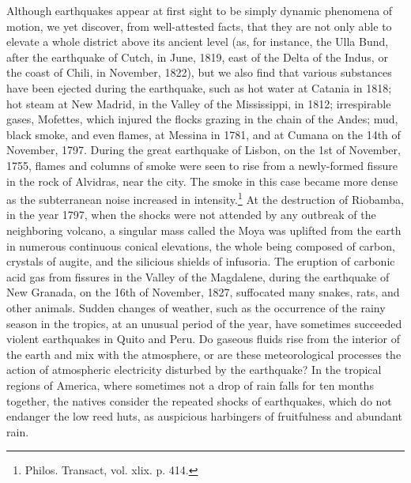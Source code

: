 Although earthquakes appear at first sight to be simply dynamic phenomena of motion, we yet discover, from well-attested facts, that they are not only able to elevate a whole district above its ancient level (as, for instance, the Ulla Bund, after the earthquake of Cutch, in June, 1819, east of the Delta of the Indus, or the coast of Chili, in November, 1822), but we also find that various substances have been ejected during the earthquake, such as hot water at Catania in 1818; hot steam at New Madrid, in the Valley of the Mississippi, in 1812; irrespirable gases, Mofettes, which injured the flocks grazing in the chain of the Andes; mud, black smoke, and even flames, at Messina in 1781, and at Cumana on the 14th of November, 1797. During the great earthquake of Lisbon, on the 1st of November, 1755, flames and columns of smoke were seen to rise from a newly-formed fissure in the rock of Alvidras, near the city. The smoke in this case became more dense as the subterranean noise increased in intensity.\footnote{Philos. Transact, vol. xlix. p. 414.} At the destruction of Riobamba, in the year 1797, when the shocks were not attended by any outbreak of the neighboring volcano, a singular mass called the Moya was uplifted from the earth in numerous continuous conical elevations, the whole being composed of carbon, crystals of augite, and the silicious shields of infusoria. The eruption of carbonic acid gas from fissures in the Valley of the Magdalene, during the earthquake of New Granada, on the 16th of November, 1827, suffocated many snakes, rats, and other animals. Sudden changes of weather, such as the occurrence of the rainy season in the tropics, at an unusual period of the year, have sometimes succeeded violent earthquakes in Quito and Peru. Do gaseous fluids rise from the interior of the earth and mix with the atmosphere, or are these meteorological processes the action of atmospheric electricity disturbed by the earthquake? In the tropical regions of America, where sometimes not a drop of rain falls for ten months together, the natives consider the repeated shocks of earthquakes, which do not endanger the low reed huts, as auspicious harbingers of fruitfulness and abundant rain.

